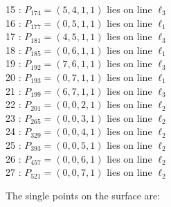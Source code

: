 \documentclass{article}
\begin{document}
{\begin{multicols}{2}
15 : $P_{174}=( 5, 4, 1, 1 )$ lies on line $\ell_{3}$\\
16 : $P_{177}=( 0, 5, 1, 1 )$ lies on line $\ell_{1}$\\
17 : $P_{181}=( 4, 5, 1, 1 )$ lies on line $\ell_{3}$\\
18 : $P_{185}=( 0, 6, 1, 1 )$ lies on line $\ell_{1}$\\
19 : $P_{192}=( 7, 6, 1, 1 )$ lies on line $\ell_{3}$\\
20 : $P_{193}=( 0, 7, 1, 1 )$ lies on line $\ell_{1}$\\
21 : $P_{199}=( 6, 7, 1, 1 )$ lies on line $\ell_{3}$\\
22 : $P_{201}=( 0, 0, 2, 1 )$ lies on line $\ell_{2}$\\
23 : $P_{265}=( 0, 0, 3, 1 )$ lies on line $\ell_{2}$\\
24 : $P_{329}=( 0, 0, 4, 1 )$ lies on line $\ell_{2}$\\
25 : $P_{393}=( 0, 0, 5, 1 )$ lies on line $\ell_{2}$\\
26 : $P_{457}=( 0, 0, 6, 1 )$ lies on line $\ell_{2}$\\
27 : $P_{521}=( 0, 0, 7, 1 )$ lies on line $\ell_{2}$\\
\end{multicols}
The single points on the surface are:\\
}
\end{document}
